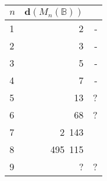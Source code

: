 \documentclass[11pt]{article}
\numberwithin{equation}{section}
\newcommand{\B}{\mathbb{B}}
\newcommand{\Bn}{M_n(\B)}
\newcommand{\cmark}{\ding{51}}
\newcommand{\xmark}{\ding{55}}
\begin{document}
\begin{figure}
  \label{figure-table-1}
  \centering
  \begin{tabular}{l|r|r}
    $n$ & $\mathbf{d}(\Bn)$ &   \\
    \hline
    1 & 2          & - \\ 
    2 & 3          & - \\ 
    3 & 5          & - \\ 
    4 & 7          & - \\
    5 & 13         & ? \\
    6 & 68         & ? \\ 
    7 & 2\ 143     & \cmark \\
    8 & 495\ 115   & \cmark \\
    9 & ?          & ?
  \end{tabular}
\vspace{1cm}


\end{figure}
\end{document}

